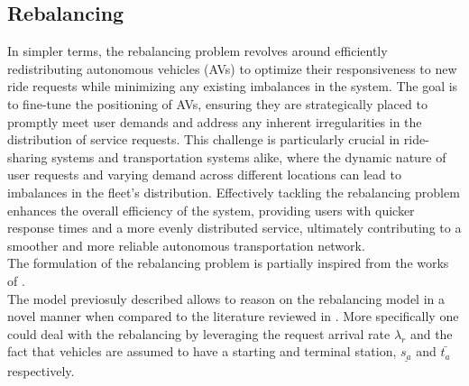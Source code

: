 \subsection{Rebalancing}\label{sec:rebal}
In simpler terms, the rebalancing problem revolves around efficiently redistributing autonomous vehicles (AVs) to optimize their responsiveness to new ride requests while minimizing any existing imbalances in the system. The goal is to fine-tune the positioning of AVs, ensuring they are strategically placed to promptly meet user demands and address any inherent irregularities in the distribution of service requests. This challenge is particularly crucial in ride-sharing  systems and transportation systems alike, where the dynamic nature of user requests and varying demand across different locations can lead to imbalances in the fleet's distribution. Effectively tackling the rebalancing problem enhances the overall efficiency of the system, providing users with quicker response times and a more evenly distributed service, ultimately contributing to a smoother and more reliable autonomous transportation network. \\
The formulation of the rebalancing problem is partially inspired from the works of .  \\
The model previosuly described allows to reason on the rebalancing model in a novel manner when compared to the literature reviewed in . More specifically one could deal with the rebalancing by leveraging the request arrival rate $\lambda_r$ and the fact that vehicles are assumed to have a starting and terminal station, $\underline{s_a}$ and $\bar{t_a}$ respectively. 

